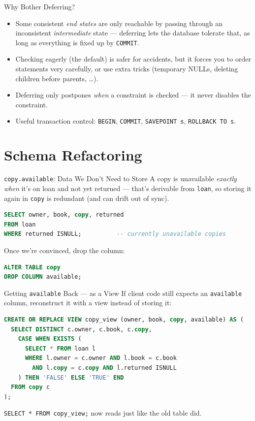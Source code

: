 \documentclass{beamer}
\begin{document}
\begin{frame}{Why Bother Deferring?}
\small
\begin{itemize}
  \item Some consistent \emph{end states} are only reachable by passing through an inconsistent \emph{intermediate} state --- deferring lets the database tolerate that, as long as everything is fixed up by \texttt{COMMIT}.
  \item Checking eagerly (the default) is safer for accidents, but it forces you to order statements very carefully, or use extra tricks (temporary NULLs, deleting children before parents, \dots).
  \item Deferring only postpones \emph{when} a constraint is checked --- it never disables the constraint.
  \item Useful transaction control: \texttt{BEGIN}, \texttt{COMMIT}, \texttt{SAVEPOINT s}, \texttt{ROLLBACK TO s}.
\end{itemize}
\end{frame}

\section{Schema Refactoring}

\begin{frame}[fragile]{\texttt{copy.available}: Data We Don't Need to Store}
\small
A copy is unavailable \emph{exactly when} it's on loan and not yet returned --- that's derivable from \texttt{loan}, so storing it again in \texttt{copy} is redundant (and can drift out of sync).
\begin{lstlisting}[language=SQL]
SELECT owner, book, copy, returned
FROM loan
WHERE returned ISNULL;          -- currently unavailable copies
\end{lstlisting}
Once we're convinced, drop the column:
\begin{lstlisting}[language=SQL]
ALTER TABLE copy
DROP COLUMN available;
\end{lstlisting}
\end{frame}

\begin{frame}[fragile]{Getting \texttt{available} Back --- as a View}
\small
If client code still expects an \texttt{available} column, reconstruct it with a view instead of storing it:
\begin{lstlisting}[language=SQL]
CREATE OR REPLACE VIEW copy_view (owner, book, copy, available) AS (
  SELECT DISTINCT c.owner, c.book, c.copy,
    CASE WHEN EXISTS (
      SELECT * FROM loan l
      WHERE l.owner = c.owner AND l.book = c.book
        AND l.copy = c.copy AND l.returned ISNULL
    ) THEN 'FALSE' ELSE 'TRUE' END
  FROM copy c
);
\end{lstlisting}
\texttt{SELECT * FROM copy\_view;} now reads just like the old table did.
\end{frame}
\end{document}
